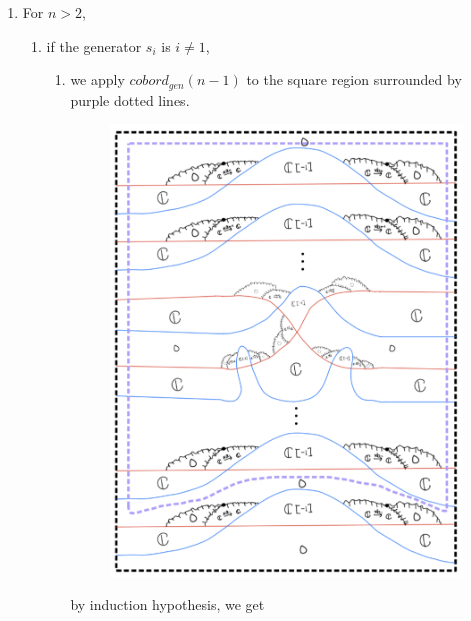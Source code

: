 \begin{enumerate}[label = (\roman*)]
\item For $n>2$,
\begin{enumerate}[label = (Case \arabic*)]
\item if the generator $s_i$ is $i\neq 1$,
\begin{enumerate}[label = (Step \arabic*)]
\item we apply $cobord_{gen}(n-1)$ to the square region surrounded by purple dotted lines.

\begin{figure}[H]
    \centering
    \includegraphics[scale = 0.95]{diagrams/cobord_gen/2.png}
    \caption{}
    \label{fig:your-label}
\end{figure}

by induction hypothesis, we get


\end{enumerate}
\end{enumerate}
\end{enumerate}
